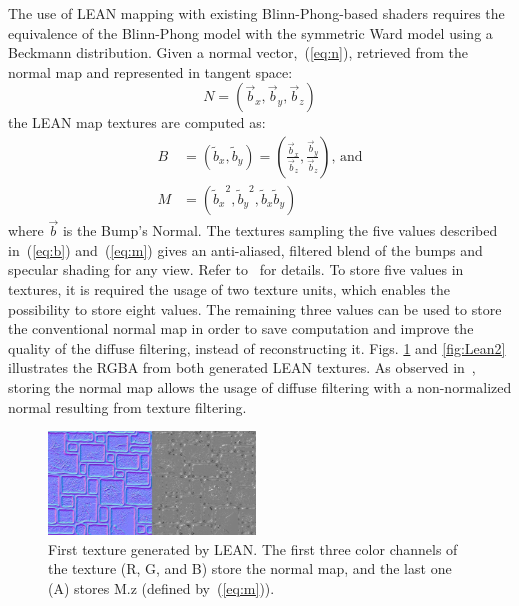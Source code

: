 \documentclass[10pt, conference]{IEEEtran}
\begin{document}
The use of LEAN mapping with existing Blinn-Phong-based shaders requires the equivalence of the Blinn-Phong model with the symmetric Ward model using a Beckmann distribution. Given a normal vector,~(\ref{eq:n}), retrieved from the normal map and represented in tangent space:
\begin{equation}
	\label{eq:n}
	N = (\vec{b}_{x}, \vec{b}_{y}, \vec{b}_{z})
\end{equation}
the LEAN map textures are computed as:
\begin{align}
	\label{eq:b}
	B &= (\tilde{b}_{x}, \tilde{b}_{y}) = \left(\frac{\vec{b}_{x}}{\vec{b}_{z}}, \frac{\vec{b}_{y}}{\vec{b}_{z}}\right) \text{, and}\\
	\label{eq:m}
	M &= ({\tilde{b}_{x}}^{2}, {\tilde{b}_{y}}^{2}, \tilde{b}_{x}\tilde{b}_{y})
\end{align}
where $\vec{b}$ is the Bump's Normal. The textures sampling the five values described in~(\ref{eq:b}) and~(\ref{eq:m}) gives an anti-aliased, filtered blend of the bumps and specular shading for any view. Refer to~\cite{Olano:2010:LM:1730804.1730834} for details. To store five values in textures, it is required the usage of two texture units, which enables the possibility to store eight values. The remaining three values can be used to store the conventional normal map in order to save computation and improve the quality of the diffuse filtering, instead of reconstructing it. Figs. \ref{fig:Lean1} and \ref{fig:Lean2} illustrates the RGBA from both generated LEAN textures. As observed in~\cite{Kilgard00apractical}, storing the normal map allows the usage of diffuse filtering with a non-normalized normal resulting from texture filtering.

\begin{figure}[here]
	\includegraphics[width=0.49\textwidth]{figs/Lean1.png}
	\caption{First texture generated by LEAN. The first three color channels of the texture (R, G, and B) store the normal map, and the last one (A) stores M.z (defined by~(\ref{eq:m})).}
	\label{fig:Lean1}
\end{figure}
\end{document}
